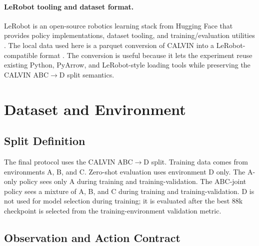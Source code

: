 \documentclass[10pt,twocolumn]{article}
\begin{document}
\paragraph{LeRobot tooling and dataset format.}
LeRobot is an open-source robotics learning stack from Hugging Face that provides policy implementations, dataset tooling, and training/evaluation utilities \cite{lerobotrepo,lerobotact}. The local data used here is a parquet conversion of CALVIN into a LeRobot-compatible format \cite{fywangdataset}. The conversion is useful because it lets the experiment reuse existing Python, PyArrow, and LeRobot-style loading tools while preserving the CALVIN ABC$\rightarrow$D split semantics.

\section{Dataset and Environment}

\subsection{Split Definition}

The final protocol uses the CALVIN ABC$\rightarrow$D split. Training data comes from environments A, B, and C. Zero-shot evaluation uses environment D only. The A-only policy sees only A during training and training-validation. The ABC-joint policy sees a mixture of A, B, and C during training and training-validation. D is not used for model selection during training; it is evaluated after the best 88k checkpoint is selected from the training-environment validation metric.

\begin{table}[H]
\centering
\caption{Local CALVIN episode coverage used by the final protocol.}
\label{tab:data}
\end{table}

\subsection{Observation and Action Contract}
\end{document}
